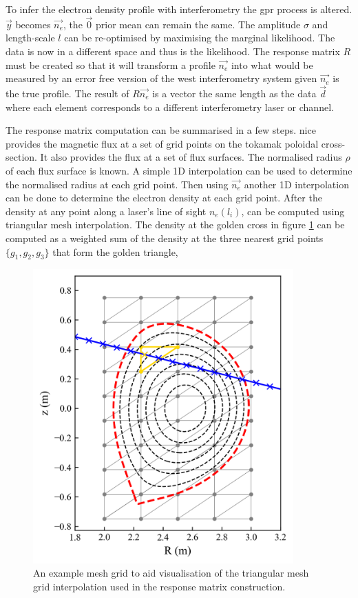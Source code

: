 To infer the electron density profile with interferometry the \gls{gpr} process is altered. $\vec{y}$ becomes $\vec{n_e}$, the $\vec{0}$ prior mean can remain the same. The amplitude $\sigma$ and length-scale $l$ can be re-optimised by maximising the marginal likelihood. The data is now in a different space and thus is the likelihood. The response matrix $R$ must be created so that it will transform a profile $\vec{n_e}$ into what would be measured by an error free version of the \gls{west} interferometry system given $\vec{n_e}$ is the true profile. The result of $R \vec{n_e}$ is a vector the same length as the data $\vec{d}$ where each element corresponds to a different interferometry laser or channel. 

The response matrix computation can be summarised in a few steps. \Gls{nice} provides the magnetic flux at a set of grid points on the tokamak poloidal cross-section. It also provides the flux at a set of flux surfaces. The normalised radius $\rho$ of each flux surface is known. A simple 1D interpolation can be used to determine the normalised radius at each grid point. Then using $\vec{n_e}$ another 1D interpolation can be done to determine the electron density at each grid point. After the density at any point along a laser's line of sight $n_e(l_i)$, can be computed using triangular mesh interpolation. The density at the golden cross in figure \ref{fig:meshtriangle} can be computed as a weighted sum of the density at the three nearest grid points $\{g_1, g_2, g_3\}$ that form the golden triangle,

\begin{figure}
  \centering
  \includegraphics[width=10cm]{images/meshtriangle.png}
  \caption{An example mesh grid to aid visualisation of the triangular mesh grid interpolation used in the response matrix construction.}
  \label{fig:meshtriangle}
\end{figure}

